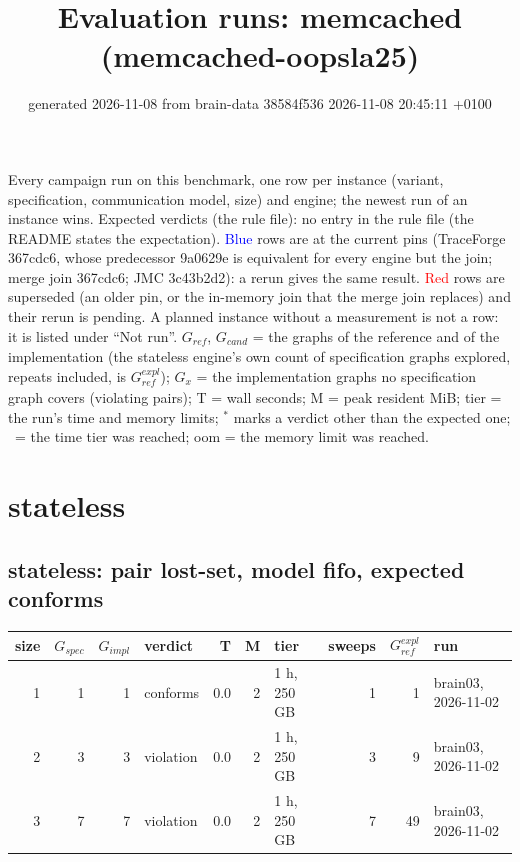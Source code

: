 \documentclass[10pt]{article}
\title{Evaluation runs: \textsf{memcached} (memcached-oopsla25)}
\author{}
\date{generated 2026-11-08 from brain-data 38584f536 2026-11-08 20:45:11 +0100}
\begin{document}
\maketitle\small
\noindent Every campaign run on this benchmark, one row per instance (variant, specification, communication model, size) and engine; the newest run of an instance wins. Expected verdicts (the rule file): no entry in the rule file (the README states the expectation). \textcolor{blue}{Blue} rows are at the current pins (TraceForge 367cdc6, whose predecessor 9a0629e is equivalent for every engine but the join; merge join 367cdc6; JMC 3c43b2d2): a rerun gives the same result. \textcolor{red}{Red} rows are superseded (an older pin, or the in-memory join that the merge join replaces) and their rerun is pending. A planned instance without a measurement is not a row: it is listed under ``Not run''. $G_{\mathit{ref}}$, $G_{\mathit{cand}}$ = the graphs of the reference and of the implementation (the stateless engine's own count of specification graphs explored, repeats included, is $G_{\mathit{ref}}^{\mathit{expl}}$); $G_x$ = the implementation graphs no specification graph covers (violating pairs); T = wall seconds; M = peak resident MiB; tier = the run's time and memory limits; $^{\ast}$ marks a verdict other than the expected one; \faClock\ = the time tier was reached; oom = the memory limit was reached.

\section*{stateless}
\subsection*{stateless: pair \textsf{lost-set}, model fifo, expected conforms}
\begin{longtable}{@{}rrrlrrlrrl@{}}
\toprule
size & $G_{\mathit{spec}}$ & $G_{\mathit{impl}}$ & verdict & T & M & tier & sweeps & $G_{\mathit{ref}}^{\mathit{expl}}$ & run \\
\midrule
\endhead
\color{blue} 1 & 1 & 1 & conforms & 0.0 & 2 & 1 h, 250 GB & 1 & 1 & brain03, 2026-11-02 \\
\color{blue} 2 & 3 & 3 & violation & 0.0 & 2 & 1 h, 250 GB & 3 & 9 & brain03, 2026-11-02 \\
\color{blue} 3 & 7 & 7 & violation & 0.0 & 2 & 1 h, 250 GB & 7 & 49 & brain03, 2026-11-02 \\
\bottomrule
\end{longtable}
\end{document}

